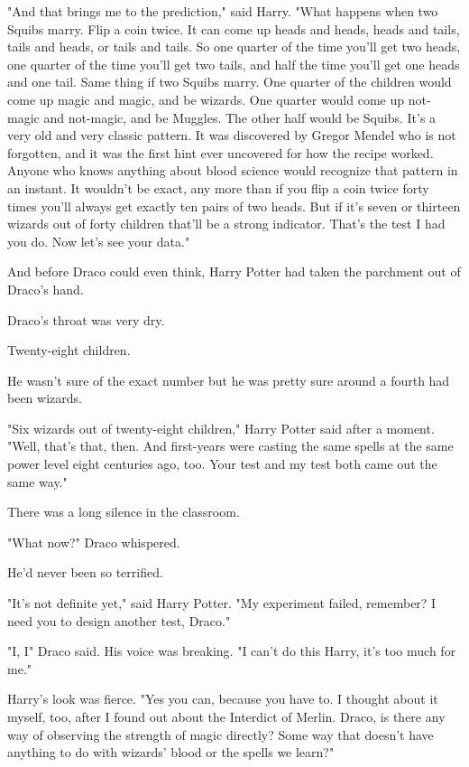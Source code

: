 "And that brings me to the prediction," said Harry. "What happens when two
Squibs marry. Flip a coin twice. It can come up heads and heads, heads and
tails, tails and heads, or tails and tails. So one quarter of the time you'll
get two heads, one quarter of the time you'll get two tails, and half the time
you'll get one heads and one tail. Same thing if two Squibs marry. One quarter
of the children would come up magic and magic, and be wizards. One quarter
would come up not-magic and not-magic, and be Muggles. The other half would be
Squibs. It's a very old and very classic pattern. It was discovered by Gregor
Mendel who is not forgotten, and it was the first hint ever uncovered for how
the recipe worked. Anyone who knows anything about blood science would
recognize that pattern in an instant. It wouldn't be exact, any more than if
you flip a coin twice forty times you'll always get exactly ten pairs of two
heads. But if it's seven or thirteen wizards out of forty children that'll be a
strong indicator. That's the test I had you do. Now let's see your data."

And before Draco could even think, Harry Potter had taken the parchment out of
Draco's hand.

Draco's throat was very dry.

Twenty-eight children.

He wasn't sure of the exact number but he was pretty sure around a fourth had
been wizards.

"Six wizards out of twenty-eight children," Harry Potter said after a moment.
"Well, that's that, then. And first-years were casting the same spells at the
same power level eight centuries ago, too. Your test and my test both came out
the same way."

There was a long silence in the classroom.

"What now?" Draco whispered.

He'd never been so terrified.

"It's not definite yet," said Harry Potter. "My experiment failed, remember? I
need you to design another test, Draco."

"I, I{\el}" Draco said. His voice was breaking. "I can't do this Harry, it's
too much for me."

Harry's look was fierce. "Yes you can, because you have to. I thought about it
myself, too, after I found out about the Interdict of Merlin. Draco, is there
any way of observing the strength of magic directly? Some way that doesn't have
anything to do with wizards' blood or the spells we learn?"

